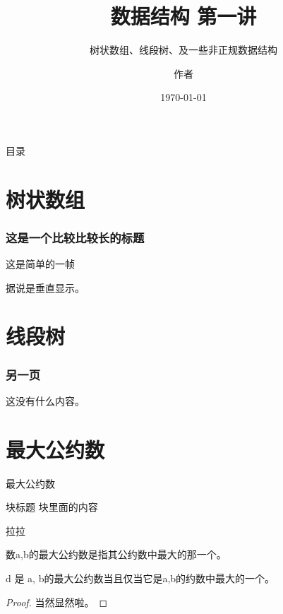 \documentclass{beamer}
\title{数据结构 第一讲}
\subtitle{树状数组、线段树、及一些非正规数据结构}
\author{作者}
\date{\today}
\begin{document}
	\maketitle
	\begin{frame}{目录}
		\tableofcontents
	\end{frame}
	
	\section{树状数组}
	\begin{frame}
		\frametitle[长标题]{这是一个比较比较长的标题}
		这是简单的一帧
		
		据说是垂直显示。
	\end{frame}
	
	\section{线段树}
	\begin{frame}
		\frametitle{另一页}
		这没有什么内容。
	\end{frame}
	
	\section{最大公约数}
	\begin{frame}{最大公约数}
		\begin{block}{块标题}
			块里面的内容
			
			拉拉
		\end{block}
		\begin{definition}[最大公约数]
			数a,b的最大公约数是指其公约数中最大的那一个。
		\end{definition}
		\begin{theorem}[最大公约数]
			d 是 a, b的最大公约数当且仅当它是a,b的约数中最大的一个。
		\end{theorem}
		\begin{proof}
			当然显然啦。
		\end{proof}
	\end{frame}
\end{document}
